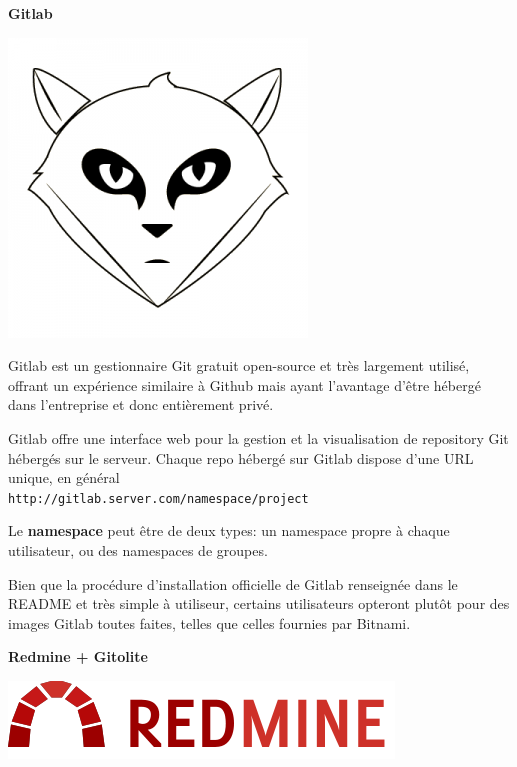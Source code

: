 \documentclass{../../common/tufte-latex/tufte-handout}
\begin{document}
\textbf{Gitlab}

\begin{marginfigure}%
  \centering
  \includegraphics[width=0.6\linewidth]{gitlab-logo.png}
  \label{fig:gitlablogo}
\end{marginfigure}

\noindent Gitlab est un gestionnaire Git gratuit open-source et très largement utilisé, offrant un expérience similaire à Github mais ayant l'avantage d'être  hébergé dans l'entreprise et donc entièrement privé.

Gitlab offre une interface web pour la gestion et la visualisation de repository Git hébergés sur le serveur.
Chaque repo hébergé sur Gitlab dispose d'une URL unique, en général \\ \noindent \texttt{http://gitlab.server.com/namespace/project}

Le \textbf{namespace} peut être de deux types: un namespace propre à chaque utilisateur, ou des namespaces de groupes.

Bien que la procédure d'installation officielle de Gitlab renseignée dans le README et très simple à utiliseur, certains utilisateurs opteront plutôt pour des images Gitlab toutes faites, telles que celles fournies par Bitnami. 

\textbf{Redmine + Gitolite}

\begin{marginfigure}%
  \centering
  \includegraphics[width=0.6\linewidth]{redmine-logo.png}
  \label{fig:gitlablogo}
\end{marginfigure}
\end{document}

